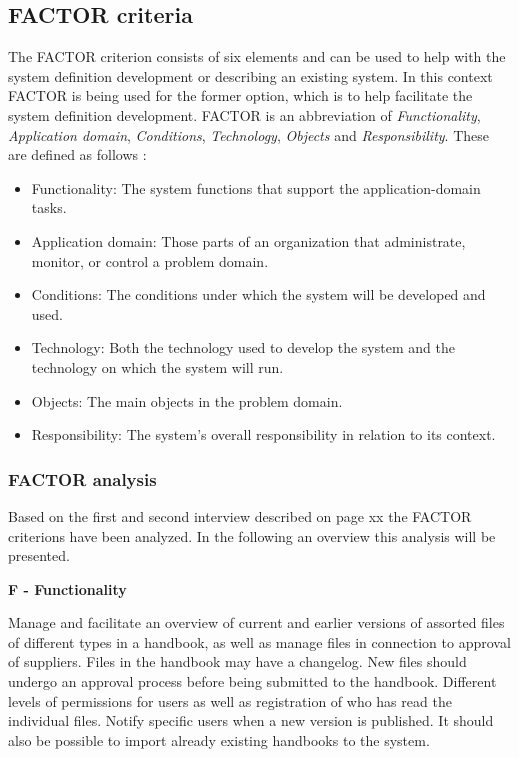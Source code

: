 \subsection{FACTOR criteria} \label{sec:factorcriteria}
The FACTOR criterion consists of six elements and can be used to help with the system definition development or describing an existing system.
In this context FACTOR is being used for the former option, which is to help facilitate the system definition development.
FACTOR is an abbreviation of \textit{Functionality}, \textit{Application domain}, \textit{Conditions}, \textit{Technology}, \textit{Objects} and \textit{Responsibility}.
These are defined as follows \citep[p.~40]{Rod-Aalborg}:
\begin{itemize}
	\item
		Functionality:
		The system functions that support the application-domain tasks.
	\item
		Application domain:
		Those parts of an organization that administrate, monitor, or control a problem domain.
	\item
		Conditions:
		The conditions under which the system will be developed and used.
	\item
		Technology:
		Both the technology used to develop the system and the technology on which the system will run.
	\item
		Objects:
		The main objects in the problem domain.
	\item
		Responsibility:
		The system’s overall responsibility in relation to its context.
\end{itemize}

\subsubsection{FACTOR analysis}\label{factor}
Based on the first and second interview described on {\color{red}page xx} the FACTOR criterions have been analyzed.
In the following an overview this analysis will be presented.

\textbf{F - Functionality}

Manage and facilitate an overview of current and earlier versions of assorted files of different types in a handbook, as well as manage files in connection to approval of suppliers.
Files in the handbook may have a changelog.
New files should undergo an approval process before being submitted to the handbook.
Different levels of permissions for users as well as registration of who has read the individual files.
Notify specific users when a new version is published.
It should also be possible to import already existing handbooks to the system.

